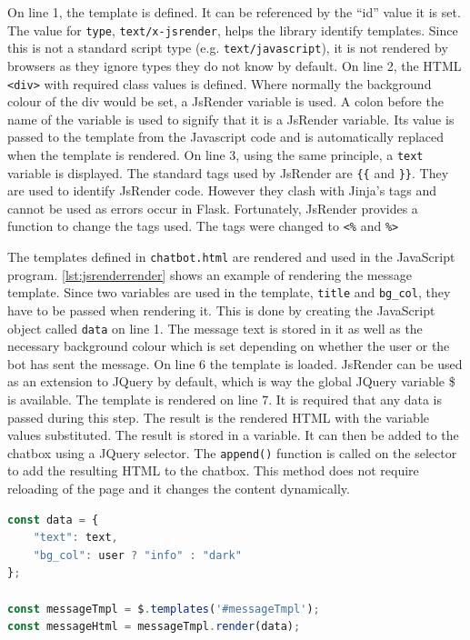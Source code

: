 \documentclass[12pt,a4paper]{article}
\newcommand{\captionstyle}[1] {
    \small{#1}
}
\begin{document}
On line 1, the template is defined. It can be referenced by the “id” value it is set. The value for \texttt{type}, \texttt{text/x-jsrender}, helps the library identify templates. Since this is not a standard script type (e.g. \texttt{text/javascript}), it is not rendered by browsers as they ignore types they do not know by default. On line 2, the HTML \texttt{<div>} with required class values is defined. Where normally the background colour of the div would be set, a JsRender variable is used. A colon before the name of the variable is used to signify that it is a JsRender variable. Its value is passed to the template from the Javascript code and is automatically replaced when the template is rendered. On line 3, using the same principle, a \texttt{text} variable is displayed. The standard tags used by JsRender are \verb|{{| and \verb|}}|. They are used to identify JsRender code. However they clash with Jinja’s tags and cannot be used as errors occur in Flask. Fortunately, JsRender provides a function to change the tags used. The tags were changed to \texttt{<\%} and \texttt{\%>} 

The templates defined in \texttt{chatbot.html} are rendered and used in the JavaScript program. \cref{lst:jsrenderrender} shows an example of rendering the message template. Since two variables are used in the template, \texttt{title} and \texttt{bg\_col}, they have to be passed when rendering it. This is done by creating the JavaScript object called \texttt{data} on line 1. The message text is stored in it as well as the necessary background colour which is set depending on whether the user or the bot has sent the message. On line 6 the template is loaded. JsRender can be used as an extension to JQuery by default, which is way the global JQuery variable \$ is available. The template is rendered on line 7. It is required that any data is passed during this step. The result is the rendered HTML with the variable values substituted. The result is stored in a variable. It can then be added to the chatbox using a JQuery selector. The \texttt{append()} function is called on the selector to add the resulting HTML to the chatbox. This method does not require reloading of the page and it changes the content dynamically. 

\begin{lstlisting}[language=JavaScript, caption={\captionstyle{Rendering the JsRender message template.}}, label={lst:jsrenderrender}]
const data = {
    "text": text,
    "bg_col": user ? "info" : "dark"
};

const messageTmpl = $.templates('#messageTmpl');
const messageHtml = messageTmpl.render(data);
\end{lstlisting}
\end{document}
